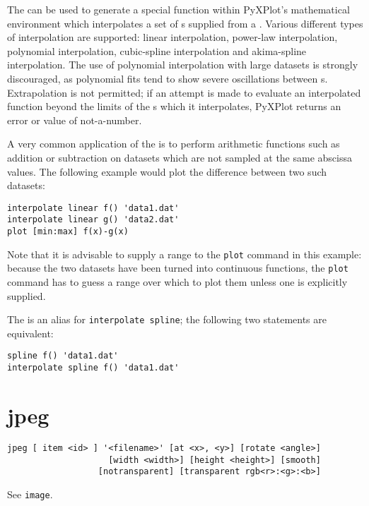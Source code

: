 The  can be used to generate a special function within
PyXPlot's mathematical environment which interpolates a set of \datapoint s
supplied from a \datafile.  Various different types of interpolation are
supported: linear interpolation, power-law interpolation, polynomial
interpolation, cubic-spline interpolation and akima-spline interpolation. The
use of polynomial interpolation with large datasets is strongly discouraged, as
polynomial fits tend to show severe oscillations between \datapoint s.
Extrapolation is not permitted; if an attempt is made to evaluate an
interpolated function beyond the limits of the \datapoint s which it
interpolates, PyXPlot returns an error or value of not-a-number.

A very common application of the  is to perform arithmetic
functions such as addition or subtraction on datasets which are not sampled at
the same abscissa values. The following example would plot the difference
between two such datasets:

\begin{verbatim}
interpolate linear f() 'data1.dat'
interpolate linear g() 'data2.dat'
plot [min:max] f(x)-g(x)
\end{verbatim}

\noindent Note that it is advisable to supply a range to the {\tt plot} command
in this example: because the two datasets have been turned into continuous
functions, the {\tt plot} command has to guess a range over which to plot them
unless one is explicitly supplied.

The  is an alias for {\tt interpolate spline}; the following
two statements are equivalent:

\begin{verbatim}
spline f() 'data1.dat'
interpolate spline f() 'data1.dat'
\end{verbatim}


\section{jpeg}

\begin{verbatim}
jpeg [ item <id> ] '<filename>' [at <x>, <y>] [rotate <angle>]
                    [width <width>] [height <height>] [smooth]
                  [notransparent] [transparent rgb<r>:<g>:<b>]
\end{verbatim}

See {\tt image}.


